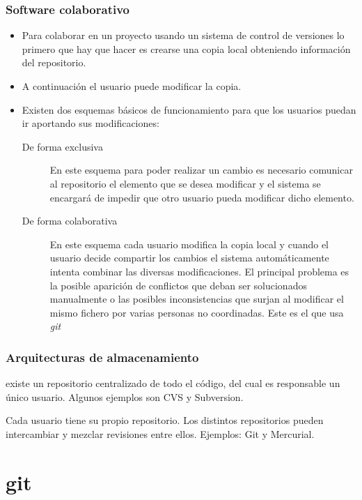 \documentclass{beamer}
\begin{document}
\begin{frame} 
\frametitle{Software colaborativo}
\begin{itemize}[<+->]
\item Para colaborar en un proyecto usando un sistema de control de versiones lo primero que hay que hacer es crearse una copia local obteniendo información del repositorio. 
\item A continuación el usuario puede modificar la copia. 
\item Existen dos esquemas básicos de funcionamiento para que los usuarios puedan ir aportando sus modificaciones:
\begin{footnotesize}

\begin{description}
\item[De forma exclusiva] En este esquema para poder realizar un cambio es necesario comunicar al repositorio el elemento que se desea modificar y el sistema se encargará de impedir que otro usuario pueda modificar dicho elemento.
\item[De forma colaborativa] En este esquema cada usuario modifica la copia local y cuando el usuario decide compartir los cambios el sistema automáticamente intenta combinar las diversas modificaciones. El principal problema es la posible aparición de conflictos que deban ser solucionados manualmente o las posibles inconsistencias que surjan al modificar el mismo fichero por varias personas no coordinadas. Este es el que usa \emph{git}
\end{description}
\end{footnotesize}
\end{itemize} 
\end{frame}


\begin{frame}
\frametitle{Arquitecturas de almacenamiento}
\begin{description}[<+->]
\item[Centralizados] existe un repositorio centralizado de todo el código, del cual es responsable un único usuario. Algunos ejemplos son CVS y Subversion.
\item[Distribuidos] Cada usuario tiene su propio repositorio. Los distintos repositorios pueden intercambiar y mezclar revisiones entre ellos. Ejemplos: Git y Mercurial.
\end{description} 
\end{frame}

\section{git}
\end{document}
